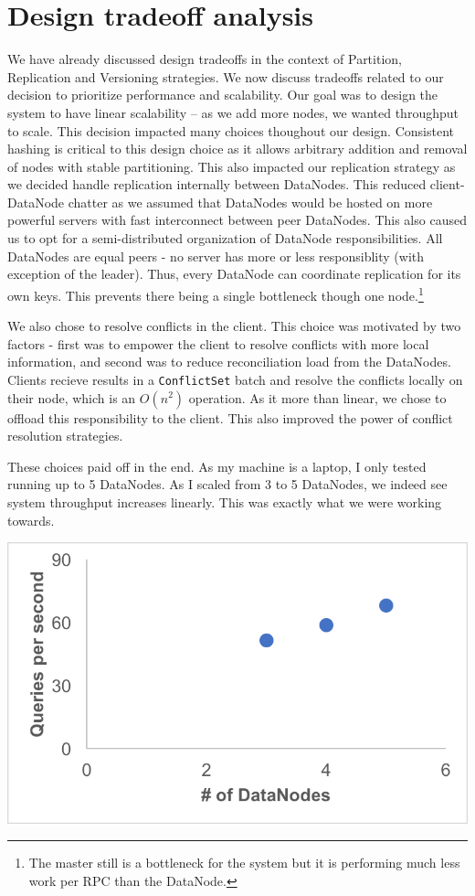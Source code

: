 \documentclass[paper=a4,fontsize=11pt]{report} %
\numberwithin{equation}{section} %
\numberwithin{figure}{section} %
\numberwithin{table}{section} %
\begin{document}
\section{Design tradeoff analysis}
We have already discussed design tradeoffs in the context of Partition, Replication and Versioning strategies. We now discuss tradeoffs related to our decision to prioritize performance and scalability. Our goal was to design the system to have linear scalability -- as we add more nodes, we wanted throughput to scale. This decision impacted many choices thoughout our design. Consistent hashing is critical to this design choice as it allows arbitrary addition and removal of nodes with stable partitioning. This also impacted our replication strategy as we decided handle replication internally between DataNodes. This reduced client-DataNode chatter as we assumed that DataNodes would be hosted on more powerful servers with fast interconnect between peer DataNodes. This also caused us to opt for a semi-distributed organization of DataNode responsibilities. All DataNodes are equal peers - no server has more or less responsiblity (with exception of the leader). Thus, every DataNode can coordinate replication for its own keys. This prevents there being a single bottleneck though one node.\footnote{The master still is a bottleneck for the system but it is performing much less work per RPC than the DataNode.}

We also chose to resolve conflicts in the client. This choice was motivated by two factors - first was to empower the client to resolve conflicts with more local information, and second was to reduce reconciliation load from the DataNodes. Clients recieve results in a \texttt{ConflictSet} batch and resolve the conflicts locally on their node, which is an $O(n^2)$ operation. As it more than linear, we chose to offload this responsibility to the client. This also improved the power of conflict resolution
strategies.

These choices paid off in the end. As my machine is a laptop, I only tested running up to 5 DataNodes. As I scaled from 3 to 5 DataNodes, we indeed see system throughput increases linearly. This was exactly what we were working towards.

\noindent\includegraphics[width=.65\textwidth]{LinearScaling.png}
\end{document}

